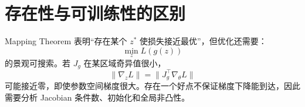 \documentclass[UTF8,12pt,a4paper,fontset=none]{ctexart}
\numberwithin{equation}{section}
\begin{document}
\section{存在性与可训练性的区别}
Mapping Theorem 表明“存在某个 $z^*$ 使损失接近最优”，但优化还需要：
\begin{equation}
 \min_z L(g(z))
\end{equation}
的景观可搜索。若 $J_g$ 在某区域奇异值很小，
\begin{equation}
 \|\nabla_zL\|=\|J_g^\top\nabla_\theta L\|
\end{equation}
可能接近零，即使参数空间梯度很大。存在一个好点不保证梯度下降能到达，因此需要分析 Jacobian 条件数、初始化和全局非凸性。
\end{document}
